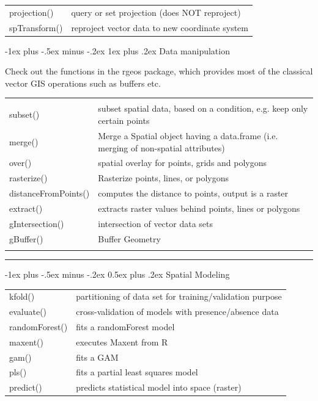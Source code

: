 \documentclass[10pt,landscape]{article}
\makeatletter
\renewcommand{\section}{\@startsection{section}{1}{0mm}%
                                {-1ex plus -.5ex minus -.2ex}%
                                {0.5ex plus .2ex}%
                                {\normalfont\large\bfseries}}
\renewcommand{\subsubsection}{\@startsection{subsubsection}{3}{0mm}%
                                {-1ex plus -.5ex minus -.2ex}%
                                {1ex plus .2ex}%
                                {\normalfont\small\bfseries}}
\makeatother
\begin{document}
\begin{multicols}{3}
\begin{tabular}{@{}p{\the\MyLen}%
                @{}p{\linewidth-\the\MyLen}@{}}
                
projection()	  & query or set projection (does NOT reproject)\\                               
spTransform()	  & reproject vector data to new coordinate system \\
               

\end{tabular}


\subsubsection{Data manipulation}

Check out the functions in the rgeos package, which provides most of the classical vector GIS operations such as buffers etc.\\


\begin{tabular}{@{}p{\the\MyLen}%
                @{}p{\linewidth-\the\MyLen}@{}}
                & \\
subset()		& subset spatial data, based on a condition, e.g. keep only certain points \\                
merge() 		& Merge a Spatial object having a data.frame (i.e. merging of non-spatial attributes)\\
over()			& spatial overlay for points, grids and polygons \\
rasterize() 		& Rasterize points, lines, or polygons\\ 
distanceFromPoints()    & computes the distance to points, output is a raster\\
extract()		& extracts raster values behind points, lines or polygons \\
gIntersection()		& intersection of vector data sets \\
gBuffer()		& Buffer Geometry \\
 & 
\end{tabular}


\rule{0.32\textwidth}{0.4pt}



\section{Spatial Modeling}

\begin{tabular}{@{}p{\the\MyLen}%
                @{}p{\linewidth-\the\MyLen}@{}}
kfold() & partitioning of data set for training/validation purpose\\
evaluate() & cross-validation of models with presence/absence data\\               
randomForest() & fits a randomForest model  \\
maxent() & executes Maxent from R\\
gam() & fits a GAM \\
pls() & fits a partial least squares model \\                
predict() & predicts statistical model into space (raster) \\


\end{tabular}
\end{multicols}
\end{document}
